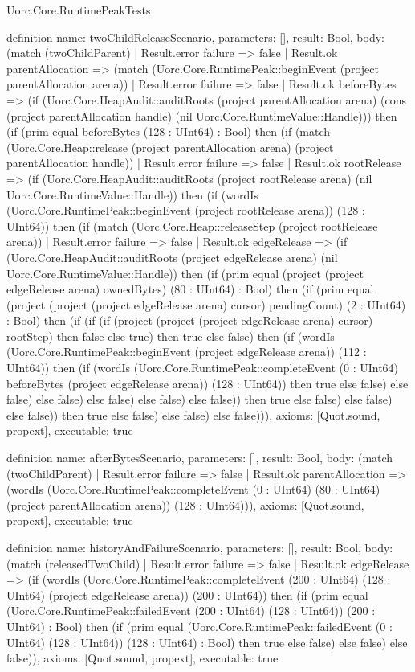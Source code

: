 \begin{lexlean}{Uorc.Core.RuntimePeakTests}
\begin{semanticmodule}
definition{
  name: twoChildReleaseScenario,
  parameters: [],
  result: Bool,
  body: (match (twoChildParent)
    | Result.error failure => false
    | Result.ok parentAllocation => (match (Uorc.Core.RuntimePeak::beginEvent (project parentAllocation arena))
      | Result.error failure => false
      | Result.ok beforeBytes => (if (Uorc.Core.HeapAudit::auditRoots (project parentAllocation arena) (cons (project parentAllocation handle) (nil Uorc.Core.RuntimeValue::Handle))) then (if (prim equal beforeBytes (128 : UInt64) : Bool) then (if (match (Uorc.Core.Heap::release (project parentAllocation arena) (project parentAllocation handle))
        | Result.error failure => false
        | Result.ok rootRelease => (if (Uorc.Core.HeapAudit::auditRoots (project rootRelease arena) (nil Uorc.Core.RuntimeValue::Handle)) then (if (wordIs (Uorc.Core.RuntimePeak::beginEvent (project rootRelease arena)) (128 : UInt64)) then (if (match (Uorc.Core.Heap::releaseStep (project rootRelease arena))
          | Result.error failure => false
          | Result.ok edgeRelease => (if (Uorc.Core.HeapAudit::auditRoots (project edgeRelease arena) (nil Uorc.Core.RuntimeValue::Handle)) then (if (prim equal (project (project edgeRelease arena) ownedBytes) (80 : UInt64) : Bool) then (if (prim equal (project (project (project edgeRelease arena) cursor) pendingCount) (2 : UInt64) : Bool) then (if (if (if (project (project (project edgeRelease arena) cursor) rootStep) then false else true) then true else false) then (if (wordIs (Uorc.Core.RuntimePeak::beginEvent (project edgeRelease arena)) (112 : UInt64)) then (if (wordIs (Uorc.Core.RuntimePeak::completeEvent (0 : UInt64) beforeBytes (project edgeRelease arena)) (128 : UInt64)) then true else false) else false) else false) else false) else false) else false)) then true else false) else false) else false)) then true else false) else false) else false))),
  axioms: [Quot.sound, propext],
  executable: true
}

definition{
  name: afterBytesScenario,
  parameters: [],
  result: Bool,
  body: (match (twoChildParent)
    | Result.error failure => false
    | Result.ok parentAllocation => (wordIs (Uorc.Core.RuntimePeak::completeEvent (0 : UInt64) (80 : UInt64) (project parentAllocation arena)) (128 : UInt64))),
  axioms: [Quot.sound, propext],
  executable: true
}

definition{
  name: historyAndFailureScenario,
  parameters: [],
  result: Bool,
  body: (match (releasedTwoChild)
    | Result.error failure => false
    | Result.ok edgeRelease => (if (wordIs (Uorc.Core.RuntimePeak::completeEvent (200 : UInt64) (128 : UInt64) (project edgeRelease arena)) (200 : UInt64)) then (if (prim equal (Uorc.Core.RuntimePeak::failedEvent (200 : UInt64) (128 : UInt64)) (200 : UInt64) : Bool) then (if (prim equal (Uorc.Core.RuntimePeak::failedEvent (0 : UInt64) (128 : UInt64)) (128 : UInt64) : Bool) then true else false) else false) else false)),
  axioms: [Quot.sound, propext],
  executable: true
}


\end{semanticmodule}
\end{lexlean}
